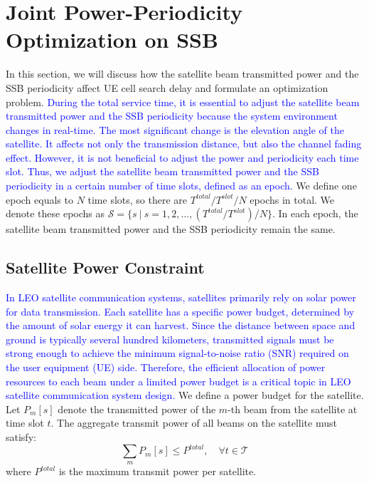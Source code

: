 \section{Joint Power-Periodicity Optimization on SSB}
In this section, we will discuss how the satellite beam transmitted power and the SSB periodicity affect UE cell search delay and formulate an optimization problem. 
\textcolor{blue}{During the total service time, it is essential to adjust the satellite beam transmitted power and the SSB periodicity because the system environment changes in real-time. The most significant change is the elevation angle of the satellite. It affects not only the transmission distance, but also the channel fading effect. However, it is not beneficial to adjust the power and periodicity each time slot. Thus, we adjust the satellite beam transmitted power and the SSB periodicity in a certain number of time slots, defined as an epoch. }We define one epoch equals to $N$ time slots, so there are $T^{total} / T^{slot} / N$ epochs in total. We denote these epochs as $\mathcal{S} = \{s\ |\ s = 1, 2, \ldots, (T^{total} / T^{slot}) / N\}$. In each epoch, the satellite beam transmitted power and the SSB periodicity remain the same. 

\subsection{Satellite Power Constraint}

\textcolor{blue}{In LEO satellite communication systems, satellites primarily rely on solar power for data transmission. Each satellite has a specific power budget, determined by the amount of solar energy it can harvest. Since the distance between space and ground is typically several hundred kilometers, transmitted signals must be strong enough to achieve the minimum signal-to-noise ratio (SNR) required on the user equipment (UE) side. Therefore, the efficient allocation of power resources to each beam under a limited power budget is a critical topic in LEO satellite communication system design.}
We define a power budget for the satellite. Let $P_{m}[s]$ denote the transmitted power of the $m$-th beam from the satellite at time slot $t$. The aggregate transmit power of all beams on the satellite must satisfy:
\begin{equation}
    \sum_{m} P_{m}[s] \leq P^{total}, \quad \forall t \in \mathcal{T}
\end{equation}
where $P^{total}$ is the maximum transmit power per satellite.


